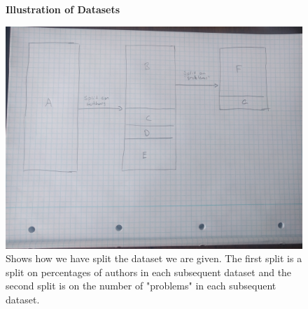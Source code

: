\begin{figure}
    \centering
    \textbf{Illustration of Datasets}\par\medskip
    \includegraphics[width=\textwidth]{./pictures/data/data_split.jpg}
    \caption{Shows how we have split the dataset we are given. The first split
        is a split on percentages of authors in each subsequent dataset and the
        second split is on the number of "problems" in each subsequent dataset.}
    \label{fig:data_split}
\end{figure}

